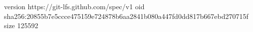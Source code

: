 version https://git-lfs.github.com/spec/v1
oid sha256:20855b7e5ccce475159e724878b6aa2841b080a447fd0dd817b667ebd270715f
size 125592
